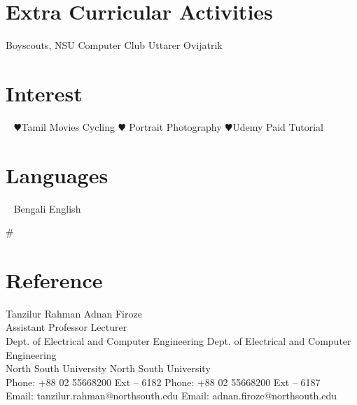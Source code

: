 \documentclass[]{cv-style}
\begin{document}
\begin{aside}
\section{Extra Curricular Activities}
      Boyscouts,
      NSU Computer Club
      Uttarer Ovijatrik 
      ~
      \section{Interest}
~
       {\color{red} $\varheartsuit$}Tamil Movies
      Cycling
      {\color{red} $\varheartsuit$}  Portrait Photography
        {\color{red} $\varheartsuit$}Udemy Paid Tutorial
      ~
\section{Languages}
~
    Bengali
    English
    ~
\end{aside}

\begin{multicols}{#}{}
\section{Reference}
     {Tanzilur Rahman \hspace{149pt} Adnan Firoze \\
     Assistant Professor\hspace{140pt}  Lecturer \\
     Dept. of Electrical and Computer Engineering \hspace{26pt}
     Dept. of Electrical and Computer Engineering\\
     North South University \hspace{124pt} North South University\\
     Phone: +88 02 55668200 Ext – 6182 \hspace{62pt}
     Phone: +88 02 55668200 Ext – 6187\\
     Email: tanzilur.rahman@northsouth.edu \hspace{49pt} Email: adnan.firoze@northsouth.edu
     }
   
    
    

\end{multicols}
\end{document}
